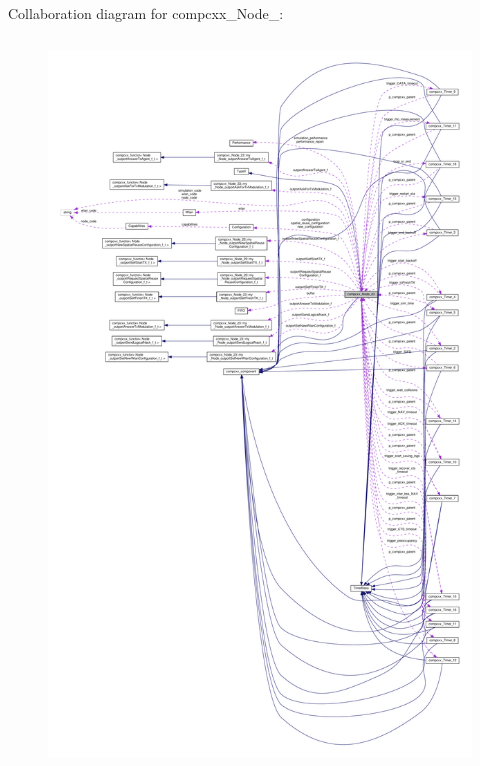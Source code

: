 Collaboration diagram for compcxx\+\_\+\+Node\+\_\+:\nopagebreak
\begin{figure}[H]
\begin{center}
\leavevmode
\includegraphics[height=550pt]{classcompcxx__Node__23__coll__graph}
\end{center}
\end{figure}
